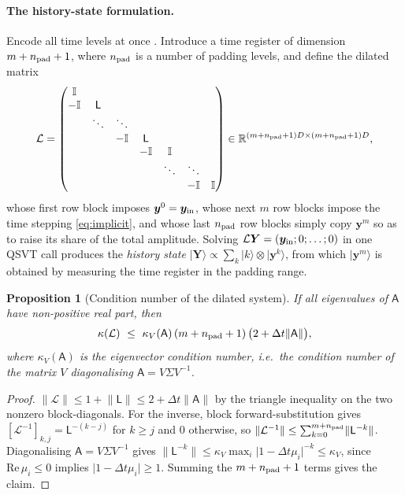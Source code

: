 \documentclass[11pt,a4paper]{article}
\theoremstyle{plain}
\newtheorem{proposition}{Proposition}[section]
\theoremstyle{definition}
\theoremstyle{remark}
\newcommand{\R}{\mathbb{R}}
\newcommand{\ket}[1]{\lvert #1 \rangle}
\newcommand{\norm}[1]{\lVert #1 \rVert}
\newcommand{\abs}[1]{\lvert #1 \rvert}
\newcommand{\Id}{\mathbb{I}}
\newcommand{\yvec}{\bm{y}}
\newcommand{\Lmat}{\mathsf{L}}
\newcommand{\Amat}{\mathsf{A}}
\begin{document}
\paragraph{The history-state formulation.}  Encode all time levels at once
\cite{Berry2014,Berry2017,Liu2021}.  Introduce a time register of dimension
$m+n_{\rm pad}+1$, where $n_{\rm pad}$ is a number of padding levels, and define the
dilated matrix
\begin{equation}
\mathcal{L}=
\begin{pmatrix}
\Id & & & & & \\
-\Id & \Lmat & & & & \\
 & \ddots & \ddots & & & \\
 & & -\Id & \Lmat & & \\
 & & & -\Id & \Id & \\
 & & & & \ddots & \ddots \\
 & & & & & -\Id & \Id
\end{pmatrix}
\in\R^{(m+n_{\rm pad}+1)D\times(m+n_{\rm pad}+1)D},
\label{eq:dilated}
\end{equation}
whose first row block imposes $\yvec^0=\yvec_{\rm in}$, whose next $m$ row blocks
impose the time stepping \eqref{eq:implicit}, and whose last $n_{\rm pad}$ row blocks
simply copy $\yvec^m$ so as to raise its share of the total amplitude.  Solving
$\mathcal{L}\bm{Y}=(\yvec_{\rm in};0;\dots;0)$ in one QSVT call produces the
\emph{history state}
$\ket{\bm Y}\propto\sum_{k}\ket{k}\otimes\ket{\yvec^{k}}$, from which
$\ket{\yvec^m}$ is obtained by measuring the time register in the padding range.

\begin{proposition}[Condition number of the dilated system]
\label{prop:dilkappa}
If all eigenvalues of $\Amat$ have non-positive real part, then
\begin{equation}
\kappa(\mathcal{L})\ \le\ \kappa_V(\Amat)\,(m+n_{\rm pad}+1)\,\bigl(2+\Delta t\norm{\Amat}\bigr),
\label{eq:dilkappa}
\end{equation}
where $\kappa_V(\Amat)$ is the eigenvector condition number, i.e.\ the condition
number of the matrix $V$ diagonalising $\Amat=V\Sigma V^{-1}$.
\end{proposition}

\begin{proof}
$\norm{\mathcal{L}}\le1+\norm{\Lmat}\le2+\Delta t\norm{\Amat}$ by the triangle
inequality on the two nonzero block-diagonals.  For the inverse, block
forward-substitution gives
$[\mathcal{L}^{-1}]_{k,j}=\Lmat^{-(k-j)}$ for $k\ge j$ and $0$ otherwise, so
$\norm{\mathcal{L}^{-1}}\le\sum_{k=0}^{m+n_{\rm pad}}\norm{\Lmat^{-k}}$.  Diagonalising
$\Amat=V\Sigma V^{-1}$ gives
$\norm{\Lmat^{-k}}\le\kappa_V\max_i\abs{1-\Delta t\mu_i}^{-k}\le\kappa_V$,
since $\mathrm{Re}\,\mu_i\le0$ implies $\abs{1-\Delta t\mu_i}\ge1$.  Summing the
$m+n_{\rm pad}+1$ terms gives the claim.
\end{proof}
\end{document}
